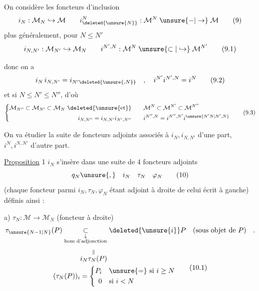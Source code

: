 On considère les foncteurs d'inclusion
\[
i_N:\mathcal M_N\hookrightarrow\mathcal M\qquad i_{\deleted{\unsure{N}}}^{N}:\mathcal M^{N}\mathrel{\unsure{-|\to}}\mathcal M\tag*{(9)}
\]
plus généralement, pour $N\leq N'$
\[
i_{N,N'}:\mathcal M_{N'}\hookrightarrow\mathcal M_N\qquad i^{N',N}:\mathcal M^{N}\mathrel{\unsure{\subset|\hookrightarrow}}\mathcal M^{N'}\tag*{(9.1)}
\]


donc on a
\[
i_N\,i_{N,N'}=i_{N'\deleted{\unsure{,N}}}\quad,\quad i^{N'}i^{N',N}=i^{N}\tag*{(9.2)}
\]
 et si $N\leq N'\leq N''$, d'où 
\[
\left\{\begin{aligned}
\mathcal M_{N''}\subset\mathcal M_{N'}\subset\mathcal M_N\ \deleted{\text{\unsure{et}}}&\qquad\mathcal M^{N}\subset\mathcal M^{N'}\subset\mathcal M^{N''}\\
i_{N,N''}=i_{N,N'}i_{N',N''}&\qquad i^{N'',N}=i^{N'',N'}i^{\unsure{N'N|N',N}}
\end{aligned}\right.\tag*{(9.3)}
\]

On va étudier la suite de foncteurs adjoints associés à $i_N,i_{N,N'}$ d'une part, $i^N,i^{N,N'}$ d'autre part.

\uline{Proposition} 1 \quad $i_N$ s'insère dans une suite de 4 foncteurs adjoints
\[
q_N\unsure{,}\quad i_N\quad \tau_N\quad \varphi_N\tag*{(10)}
\]
(chaque foncteur  parmi $i_N,\tau_N,\varphi_N$ étant adjoint à droite de celui écrit à  gauche) définis ainsi :

a) $\tau_N:\mathcal M\longrightarrow\mathcal M_N$ (foncteur  à droite)
\[
\tau_{\unsure{N-1|N}}(P)\mathrel{\underset{\substack{\downarrow\\\text{hom d'adjonction}}}{\subset}}\deleted{\unsure{i}}P
\quad\text{(sous objet de $P$)}\quad.
\]
\[
\begin{aligned}
&\overset{\Vert}{i_N\tau_N(P)}\\
(\tau_N(P))_{i}&=\left\{\begin{aligned}
P_i&\quad\unsure{=}\ \text{si }i\geq N\\
0&\quad\text{si }i<N
\end{aligned}\right.
\end{aligned}\tag*{(10.1)}
\]
